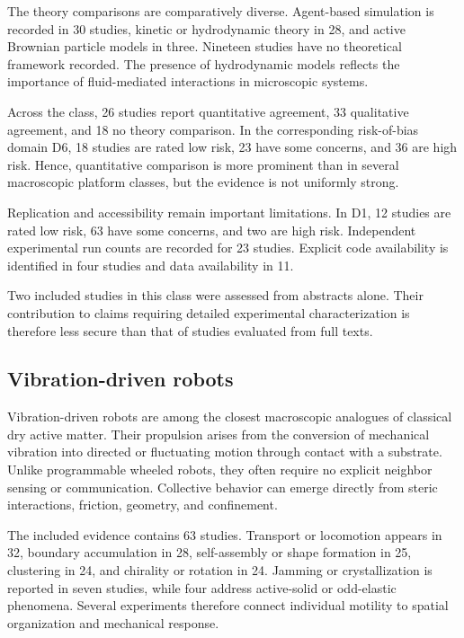 The theory comparisons are comparatively diverse.
Agent-based simulation is recorded in 30 studies,
kinetic or hydrodynamic theory in 28,
and active Brownian particle models in three.
Nineteen studies have no theoretical framework
recorded. The presence of hydrodynamic models
reflects the importance of fluid-mediated
interactions in microscopic systems.

Across the class, 26 studies report quantitative
agreement, 33 qualitative agreement, and 18
no theory comparison. In the corresponding
risk-of-bias domain D6, 18 studies are rated
low risk, 23 have some concerns, and 36 are
high risk. Hence, quantitative comparison is
more prominent than in several macroscopic
platform classes, but the evidence is not
uniformly strong.

Replication and accessibility remain important
limitations. In D1, 12 studies are rated
low risk, 63 have some concerns, and two
are high risk. Independent experimental run
counts are recorded for 23 studies. Explicit
code availability is identified in four
studies and data availability in 11.

Two included studies in this class were
assessed from abstracts alone. Their
contribution to claims requiring detailed
experimental characterization is therefore
less secure than that of studies evaluated
from full texts.

\subsection{Vibration-driven robots}
\label{sec:platforms-vibration}

Vibration-driven robots are among the closest
macroscopic analogues of classical dry active
matter. Their propulsion arises from the
conversion of mechanical vibration into
directed or fluctuating motion through
contact with a substrate. Unlike programmable
wheeled robots, they often require no explicit
neighbor sensing or communication.
Collective behavior can emerge directly
from steric interactions, friction, geometry,
and confinement.

The included evidence contains 63 studies.
Transport or locomotion appears in 32,
boundary accumulation in 28,
self-assembly or shape formation in 25,
clustering in 24, and chirality or rotation
in 24. Jamming or crystallization is
reported in seven studies, while four
address active-solid or odd-elastic
phenomena. Several experiments therefore
connect individual motility to spatial
organization and mechanical response.


